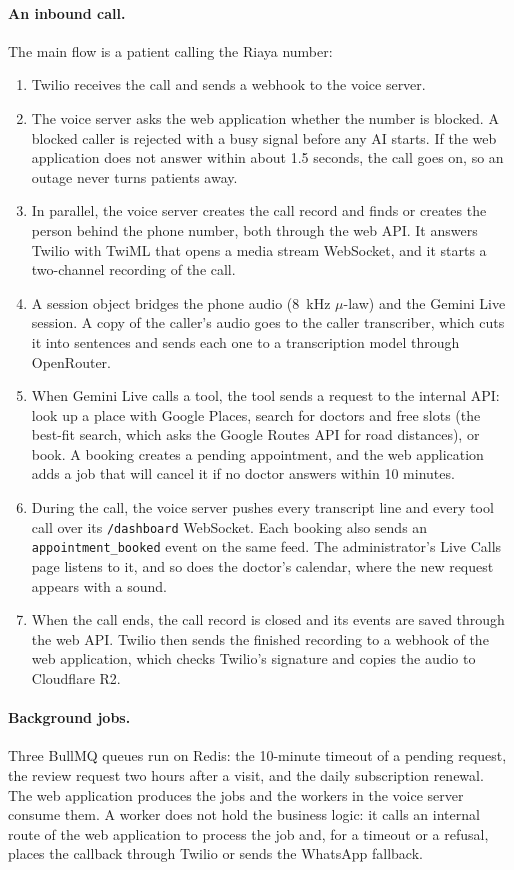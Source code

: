 \paragraph{An inbound call.} The main flow is a patient calling the Riaya number:
\begin{enumerate}
    \item Twilio receives the call and sends a webhook to the voice server.
    \item The voice server asks the web application whether the number is blocked. A blocked caller is rejected with a busy signal before any AI starts. If the web application does not answer within about 1.5 seconds, the call goes on, so an outage never turns patients away.
    \item In parallel, the voice server creates the call record and finds or creates the person behind the phone number, both through the web API. It answers Twilio with TwiML that opens a media stream WebSocket, and it starts a two-channel recording of the call.
    \item A session object bridges the phone audio (8~kHz $\mu$-law) and the Gemini Live session. A copy of the caller's audio goes to the caller transcriber, which cuts it into sentences and sends each one to a transcription model through OpenRouter.
    \item When Gemini Live calls a tool, the tool sends a request to the internal API: look up a place with Google Places, search for doctors and free slots (the best-fit search, which asks the Google Routes API for road distances), or book. A booking creates a pending appointment, and the web application adds a job that will cancel it if no doctor answers within 10 minutes.
    \item During the call, the voice server pushes every transcript line and every tool call over its \texttt{/dashboard} WebSocket. Each booking also sends an \texttt{appointment\_booked} event on the same feed. The administrator's Live Calls page listens to it, and so does the doctor's calendar, where the new request appears with a sound.
    \item When the call ends, the call record is closed and its events are saved through the web API. Twilio then sends the finished recording to a webhook of the web application, which checks Twilio's signature and copies the audio to Cloudflare R2.
\end{enumerate}

\paragraph{Background jobs.} Three BullMQ queues run on Redis: the 10-minute timeout of a pending request, the review request two hours after a visit, and the daily subscription renewal. The web application produces the jobs and the workers in the voice server consume them. A worker does not hold the business logic: it calls an internal route of the web application to process the job and, for a timeout or a refusal, places the callback through Twilio or sends the WhatsApp fallback.

